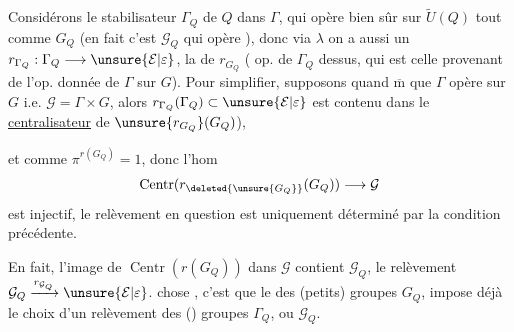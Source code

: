 Considérons le stabilisateur $\Gamma_Q$ de $Q$ dans $\Gamma$,  qui opère bien sûr sur $\widetilde U(Q)$ tout comme $G_Q$ (en fait c'est $\mathcal G_Q$ qui opère  \unsure{\dots}), donc via $\lambda$ on a aussi un  $r_{\Gamma_Q}:\Gamma_Q\longrightarrow\unsure{\mathcal E|\varepsilon}$,    la  de  $r_{G_Q}$ ( op. de  $\Gamma_Q$ dessus, qui est celle provenant de l'op. donnée de $\Gamma$ sur $G$).
Pour simplifier, supposons quand $\overline{\mathrm m}$ que $\Gamma$ opère  sur $G$ i.e. $\mathcal G=\Gamma\times G$, alors $r_{\Gamma_Q}(\Gamma_Q)\subset\unsure{\mathcal E|\varepsilon}$ est contenu dans le \uline{centralisateur} de  $\unsure{r_{G_Q}}(G_Q)$),


et comme $\pi^{r(G_Q)}=1$, donc l'hom
\[
\operatorname{Centr}(r_{\deleted{\unsure{G_Q}}}(G_Q))\longrightarrow\mathcal G
\]
est injectif, le relèvement en question  est uniquement déterminé par la condition précédente.

En fait, l'image de $\operatorname{Centr}(r(G_Q))$ dans $\mathcal G$ contient $\mathcal G_Q$,   le relèvement $\mathcal G_Q\xrightarrow{r_{\mathcal G_Q}}\unsure{\mathcal E|\varepsilon}$.
 chose , c'est que le   des (petits) groupes $G_Q$, impose déjà le choix d'un relèvement des () groupes $\Gamma_Q$, ou $\mathcal G_Q$.

